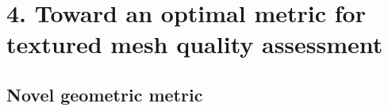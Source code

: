 \section{4. Toward an optimal metric for textured mesh quality assessment}
\subsection{Novel geometric metric}

